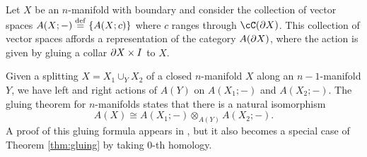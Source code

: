 Let $X$ be an $n$-manifold with boundary and consider the collection of vector spaces
$A(X; -) \stackrel{\mathrm{def}}{=} \{A(X; c)\}$ where $c$ ranges through $\cC(\bd X)$.
This collection of vector spaces affords a representation of the category $A(\partial X)$, where
the action is given by gluing a collar $\partial X\times I$ to $X$.

Given a splitting $X = X_1 \cup_Y X_2$ of a closed $n$-manifold $X$ along an $n{-}1$-manifold $Y$,
we have left and right actions of $A(Y)$ on $A(X_1; -)$ and $A(X_2; -)$.
The gluing theorem for $n$-manifolds states that there is a natural isomorphism
\[
	A(X) \cong A(X_1; -) \otimes_{A(Y)} A(X_2; -) .
\]
A proof of this gluing formula appears in \cite{kw:tqft}, but it also becomes a 
special case of Theorem \ref{thm:gluing} by taking $0$-th homology.
